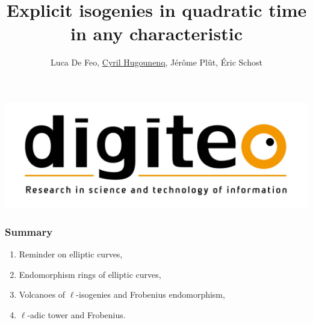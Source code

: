 \documentclass[10pt,a4paper]{beamer}
\theoremstyle{plain}
\theoremstyle{definition}
\theoremstyle{definition}
\theoremstyle{definition}
\theoremstyle{definition}
\newtheorem{defi}[thm]{Definition}
\theoremstyle{remark}
\theoremstyle{remark}
\begin{document}
\author{
 Luca De Feo, \underline{Cyril Hugounenq}, J\'er\^ome Pl\^ut, \'Eric Schost
}
\title[Explicit isogenies in quadratic time in any characteristic]{
Explicit isogenies in quadratic time in any characteristic}
\begin{frame}
\titlepage
\includegraphics[scale=0.1]{Images/digiteo.jpg} 
\end{frame}
\begin{frame}
\frametitle{Summary}
\begin{enumerate}
\item Reminder on elliptic curves,
\item Endomorphism rings  of elliptic curves, %
\item Volcanoes of $\ell$-isogenies and Frobenius endomorphism,
\item $\ell$-adic tower and Frobenius.
\end{enumerate}
\end{frame}

% 
%
\end{document}
